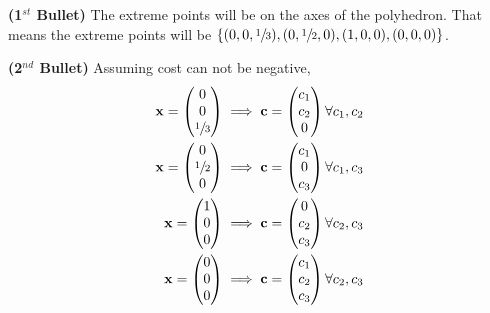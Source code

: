 \documentclass[12pt]{article}
\newcommand{\matr}[1]{\mathbf{#1}}
\newenvironment{problem}[2][Problem]{\begin{trivlist}
\item[\hskip \labelsep {\bfseries #1}\hskip \labelsep {\bfseries #2.}]}{\end{trivlist}}
\newenvironment{subproblem}[1]{\textbf{(#1)}}{}
\theoremstyle{definition}
\begin{document}
\begin{problem}{2}
\begin{subproblem}{1$^{st}$ Bullet}
The extreme points will be on the axes of the polyhedron.
That means the extreme points will be $\{(0,0,\sfrac{1}{3}), (0, \sfrac{1}{2}, 0), (1, 0, 0), (0, 0, 0)\}$.
\end{subproblem}

\begin{subproblem}{2$^{nd}$ Bullet}
Assuming cost can not be negative,
\begin{align*}
\matr{x} = \begin{pmatrix}0 \\ 0 \\ \sfrac{1}{3} \end{pmatrix} \implies \matr{c}=\begin{pmatrix}c_1 \\ c_2 \\ 0 \end{pmatrix}
\forall c_1, c_2 \\
\matr{x} = \begin{pmatrix}0 \\ \sfrac{1}{2} \\ 0 \end{pmatrix} \implies \matr{c}=\begin{pmatrix}c_1 \\ 0 \\ c_3 \end{pmatrix}
\forall c_1, c_3 \\
\matr{x} = \begin{pmatrix}1 \\ 0 \\ 0 \end{pmatrix} \implies \matr{c}=\begin{pmatrix}0 \\ c_2 \\ c_3 \end{pmatrix}
\forall c_2, c_3 \\
\matr{x} = \begin{pmatrix}0 \\ 0 \\ 0 \end{pmatrix} \implies \matr{c}=\begin{pmatrix}c_1 \\ c_2 \\ c_3 \end{pmatrix}
\forall c_2, c_3
\end{align*}
\end{subproblem}
\end{problem}
\end{document}
